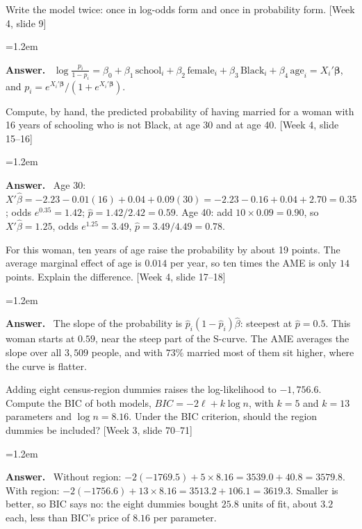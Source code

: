 \documentclass[11pt]{article}
\newenvironment{answer}{\par\smallskip
  \begin{list}{}{\leftmargin=1.2em\rightmargin=0pt}\item[]\color{dukeblue}%
  \textbf{Answer.}\ }{\end{list}\smallskip}
\newcommand{\slideref}[2]{{\footnotesize\color{gray}[Week #1, slide #2]}}
\begin{document}
\begin{enumerate}[label=(\alph*),leftmargin=*,itemsep=6pt]
\item Write the model twice: once in log-odds form and once in probability form.
      \slideref{4}{9}
\begin{answer}
$\log\frac{p_i}{1-p_i} = \beta_0 + \beta_1\,\text{school}_i + \beta_2\,\text{female}_i +
\beta_3\,\text{Black}_i + \beta_4\,\text{age}_i = X_i'\bm\beta$, and
$p_i = e^{X_i'\bm\beta}/(1+e^{X_i'\bm\beta})$.
\end{answer}

\item Compute, by hand, the predicted probability of having married for a woman with 16
      years of schooling who is not Black, at age 30 and at age 40. \slideref{4}{15--16}
\begin{answer}
Age 30: $X'\hat\beta = -2.23 - 0.01(16) + 0.04 + 0.09(30) = -2.23 - 0.16 + 0.04 + 2.70 =
0.35$; odds $e^{0.35} = 1.42$; $\hat p = 1.42/2.42 = 0.59$. Age 40: add $10 \times 0.09 =
0.90$, so $X'\hat\beta = 1.25$, odds $e^{1.25} = 3.49$, $\hat p = 3.49/4.49 = 0.78$.
\end{answer}

\item For this woman, ten years of age raise the probability by about 19 points. The
      average marginal effect of age is $0.014$ per year, so ten times the AME is only $14$
      points. Explain the difference. \slideref{4}{17--18}
\begin{answer}
The slope of the probability is $\hat p_i(1-\hat p_i)\hat\beta$: steepest at $\hat p = 0.5$.
This woman starts at $0.59$, near the steep part of the S-curve. The AME averages the slope
over all $3{,}509$ people, and with $73\%$ married most of them sit higher, where the curve
is flatter.
\end{answer}

\item Adding eight census-region dummies raises the log-likelihood to $-1{,}756.6$. Compute
      the BIC of both models, $BIC = -2\ell + k\log n$, with $k = 5$ and $k = 13$ parameters
      and $\log n = 8.16$. Under the BIC criterion, should the region dummies be included?
      \slideref{3}{70--71}
\begin{answer}
Without region: $-2(-1769.5) + 5 \times 8.16 = 3539.0 + 40.8 = 3579.8$. With region:
$-2(-1756.6) + 13 \times 8.16 = 3513.2 + 106.1 = 3619.3$. Smaller is better, so BIC says
no: the eight dummies bought $25.8$ units of fit, about $3.2$ each, less than BIC's price of
$8.16$ per parameter.
\end{answer}
\end{enumerate}
\end{document}
